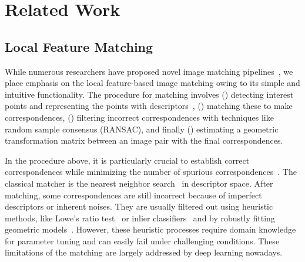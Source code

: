 \section{Related Work}
\label{sec:related}



\subsection{Local Feature Matching}


While numerous researchers have proposed novel image matching pipelines~\cite{philbin2007object,sivic2003video,pautrat2023gluestick,edstedt2024roma}, we place emphasis on the local feature-based image matching owing to its simple and intuitive functionality. The procedure for matching involves ({}) detecting interest points and representing the points with descriptors~\cite{lowe2004distinctive,bay2006surf,rublee2011orb,detone2018superpoint,dusmanu2019d2,revaud2019r2d2,yi2016lift}, ({}) matching these to make correspondences, ({}) filtering incorrect correspondences with techniques like random sample consensus (RANSAC), and finally ({}) estimating a geometric transformation matrix between an image pair with the final correspondences. 

In the procedure above, it is particularly crucial to establish correct correspondences while minimizing the number of spurious correspondences~\cite{Lim22icra-Quatro,Lim24ijrr-Quatropp}. The classical matcher is the nearest neighbor search~\cite{muja2009fast} in descriptor space. After matching, some correspondences are still incorrect because of imperfect descriptors or inherent noises. They are usually filtered out using heuristic methods, like Lowe's ratio test~\cite{lowe2004distinctive} or inlier classifiers~\cite{yi2018learning,zhang2019learning} and by robustly fitting geometric models~\cite{cavalli2020handcrafted,fischler1981random}. However, these heuristic processes require domain knowledge for parameter tuning and can easily fail under challenging conditions. These limitations of the matching are largely addressed by deep learning nowadays.

